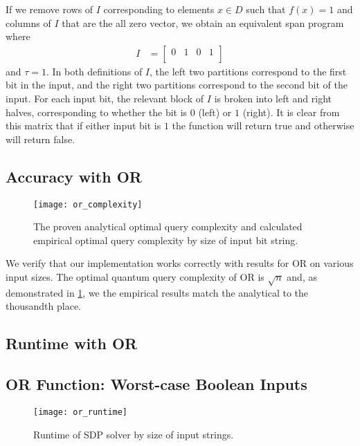If we remove rows of $I$ corresponding to elements 
$ x \in D$ such that $f(x) = 1$
and columns of $I$ that are the 
all zero vector, we obtain an equivalent span program where
\begin{align}
I &= \left[\begin{array}{cccc}
   0 & 1 & 0 & 1 \\
\end{array} \right] \nonumber
\end{align}
and $\tau = 1$.
In both definitions of $I$, the left two partitions
correspond to the first bit in the
input, and the right two partitions correspond 
to the second bit of the input. For each
input bit, the relevant block of $I$ 
is broken into left and right halves, corresponding
to whether the bit is $0$ (left) or $1$ (right). 
It is clear from this matrix that if either input bit is
$1$ the function will return true and otherwise
will return false.

\subsection{Accuracy with OR}

\begin{figure}[H]
\centering
\texttt{[image: or\_complexity]}
\caption{The proven analytical optimal query complexity
and calculated empirical optimal query complexity by 
size of input bit string.}
\label{fig:or_complexity}
\end{figure}

We verify that our implementation works correctly
with results for OR on various input sizes.
The optimal quantum query complexity of OR
is $\sqrt{n}$ and, as demonstrated in
\cref{fig:or_complexity},
we the empirical results match the analytical
to the thousandth place.



\subsection{Runtime with OR}

\subsection{OR Function: Worst-case Boolean Inputs}\label{sec:speed}



\begin{figure}[H]
\centering
\texttt{[image: or\_runtime]}
\caption{Runtime of SDP solver by size of input strings.}
\label{fig:or_all_runtime}
\end{figure}

